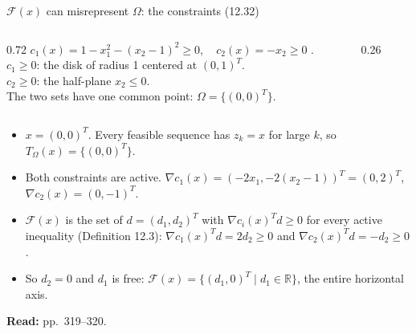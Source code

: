 \documentclass[aspectratio=169,12pt]{beamer}
\newcommand{\R}{\mathbb{R}}
\newcommand{\eqn}[1]{\text{\small(#1)}}
\newcommand{\readbook}[1]{{\color{red}\textbf{Read:} #1}}
\newcommand{\cF}{\mathcal{F}}
\newcommand{\TO}{T_{\Omega}}
\begin{document}
\begin{frame}{$\cF(x)$ can misrepresent $\Omega$: the constraints (12.32)}
  \begin{columns}[T,totalwidth=\textwidth]
    \begin{column}{0.72\textwidth}
      $c_{1}(x)=1-x_{1}^{2}-(x_{2}-1)^{2}\ge 0,\quad c_{2}(x)=-x_{2}\ge 0$ \eqn{12.32}.\\[0.3em]
      $c_{1}\ge 0$: the disk of radius 1 centered at $(0,1)^{T}$.\\
      $c_{2}\ge 0$: the half-plane $x_{2}\le 0$.\\
      The two sets have one common point: $\Omega=\{(0,0)^{T}\}$.
    \end{column}
    \begin{column}{0.26\textwidth}
      \centering
    \end{column}
  \end{columns}
  \begin{itemize}\setlength\itemsep{0.3em}
    \item $x=(0,0)^{T}$. Every feasible sequence has $z_{k}=x$ for large $k$, so $\TO(x)=\{(0,0)^{T}\}$.
    \item Both constraints are active. $\nabla c_{1}(x)=(-2x_{1},-2(x_{2}-1))^{T}=(0,2)^{T}$, $\nabla c_{2}(x)=(0,-1)^{T}$.
    \item $\cF(x)$ is the set of $d=(d_{1},d_{2})^{T}$ with $\nabla c_{i}(x)^{T}d\ge 0$ for every active inequality
      (Definition 12.3): $\nabla c_{1}(x)^{T}d=2d_{2}\ge 0$ and $\nabla c_{2}(x)^{T}d=-d_{2}\ge 0$.
    \item So $d_{2}=0$ and $d_{1}$ is free: $\cF(x)=\{(d_{1},0)^{T}\mid d_{1}\in\R\}$, the entire horizontal axis.
  \end{itemize}
  \readbook{pp.~319--320.}
\end{frame}
\end{document}
